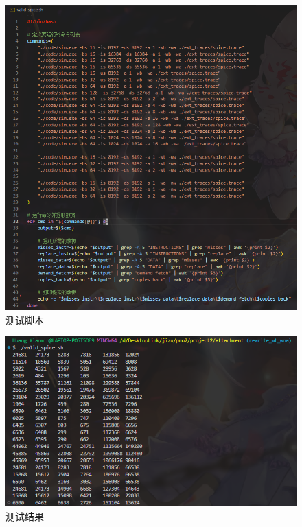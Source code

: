 \documentclass[12pt,hyperref,a4paper,UTF8]{ctexart}
\begin{document}
\begin{figure}[H]
    \centering
    \includegraphics[width=1\textwidth]{./figures/fig/image14.png}
    \caption{测试脚本}
\end{figure}


\begin{figure}[H]
    \centering
    \includegraphics[width=1\textwidth]{./figures/fig/image13.png}
    \caption{测试结果}
\end{figure}
\end{document}
